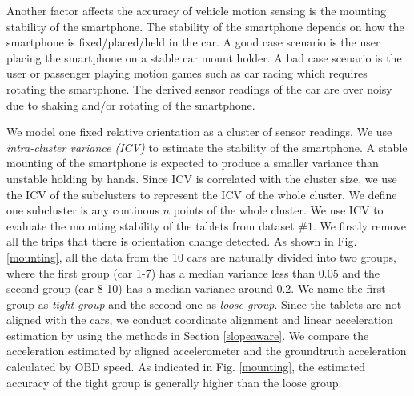 Another factor affects the accuracy of vehicle motion sensing
is the mounting stability of the smartphone. 
The stability of the smartphone depends on how the 
smartphone is fixed/placed/held in the car. 
A good case scenario is the user placing the smartphone
on a stable car mount holder. 
A bad case scenario is the user or passenger playing
motion games such as car racing which requires rotating
the smartphone. 
The derived sensor readings of the car are over noisy
due to shaking and/or rotating of the smartphone. 


We model one fixed relative orientation as a cluster of 
sensor readings. 
We use \emph{intra-cluster variance (ICV)} to estimate 
the stability of the smartphone.  
A stable mounting of the smartphone is expected to produce a smaller
variance than unstable holding by hands.  
Since ICV is correlated with the cluster
size, we use the ICV of the subclusters to represent
the ICV of the whole cluster. 
We define one subcluster is any continous $n$ 
points of the whole cluster.  
We use ICV to evaluate the mounting
stability of the tablets from dataset $\#1$. 
We firstly remove all the trips that there is orientation 
change detected. 
As shown in Fig. \ref{mounting}, 
all the data from the 10 cars are naturally divided into two groups, 
where the first group (car 1-7) has a median variance less than 0.05
and the second group (car 8-10) has a median variance around 0.2.
We name the first group as \emph{tight group} and 
the second one as \emph{loose group}. 
Since the tablets are not aligned with the cars, 
we conduct coordinate alignment and linear acceleration
estimation by using the methods in Section \ref{slopeaware}. 
We compare the acceleration estimated by aligned accelerometer
and the groundtruth acceleration calculated by OBD speed. 
As indicated in Fig. \ref{mounting}, 
the estimated accuracy of the tight group is generally higher
than the loose group. 


  


